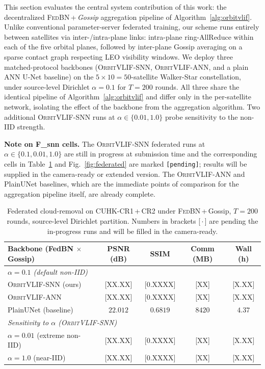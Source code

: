 \documentclass[conference]{IEEEtran}
\newcommand{\OrbitVLIF}{\textsc{OrbitVLIF}}
\begin{document}
This section evaluates the central system contribution of this
work: the decentralized \textsc{FedBN}\,+\,\emph{Gossip} aggregation
pipeline of Algorithm~\ref{alg:orbitvlif}.  Unlike conventional
parameter-server federated training, our scheme runs entirely
between satellites via inter-/intra-plane links: intra-plane
ring-AllReduce within each of the five orbital planes, followed
by inter-plane Gossip averaging on a sparse contact graph
respecting LEO visibility windows.  We deploy three matched-protocol
backbones (\OrbitVLIF{}-SNN, \OrbitVLIF{}-ANN, and a plain ANN
U-Net baseline) on the $5\!\times\!10\!=\!50$-satellite
Walker-Star constellation, under source-level Dirichlet
$\alpha\!=\!0.1$ for $T\!=\!200$ rounds. All three share the
identical pipeline of Algorithm~\ref{alg:orbitvlif} and differ
only in the per-satellite network, isolating the effect of the
backbone from the aggregation algorithm. Two additional
\OrbitVLIF{}-SNN runs at $\alpha\!\in\!\{0.01,1.0\}$ probe
sensitivity to the non-IID strength.

\textbf{Note on F\_snn cells.}\;\;
The \OrbitVLIF{}-SNN federated runs at $\alpha\!\in\!\{0.1, 0.01,
1.0\}$ are still in progress at submission time and the
corresponding cells in Table~\ref{tab:federated} and
Fig.~\ref{fig:federated} are marked \texttt{[pending]}; results
will be supplied in the camera-ready or extended version. The
\OrbitVLIF{}-ANN and PlainUNet baselines, which are the immediate
points of comparison for the aggregation pipeline itself, are
already complete.

\begin{table}[!htbp]
\centering
\caption{Federated cloud-removal on CUHK-CR1\,+\,CR2 under
\textsc{FedBN}\,+\,Gossip, $T\!=\!200$ rounds, source-level
Dirichlet partition.  Numbers in brackets [\,$\cdot$\,] are pending
the in-progress runs and will be filled in the camera-ready.}
\label{tab:federated}
\begin{tabular}{lcccc}
\toprule
Backbone (FedBN $\times$ Gossip)    & PSNR (dB) & SSIM & Comm (MB) & Wall (h) \\
\midrule
\multicolumn{5}{l}{\emph{$\alpha = 0.1$ (default non-IID)}} \\
\OrbitVLIF{}-SNN (ours)              & [XX.XX]   & [0.XXXX]  & [XX]       & [X.XX] \\
\OrbitVLIF{}-ANN                     & [XX.XX]   & [0.XXXX]  & [XX]       & [X.XX] \\
PlainUNet (baseline)                 & $22.012$  & $0.6819$  & $8420$     & $4.37$ \\
\midrule
\multicolumn{5}{l}{\emph{Sensitivity to $\alpha$ (\OrbitVLIF{}-SNN)}} \\
$\alpha = 0.01$ (extreme non-IID)    & [XX.XX]   & [0.XXXX]  & [XX]       & [X.XX] \\
$\alpha = 1.0$  (near-IID)           & [XX.XX]   & [0.XXXX]  & [XX]       & [X.XX] \\
\bottomrule
\end{tabular}
\end{table}
\end{document}
